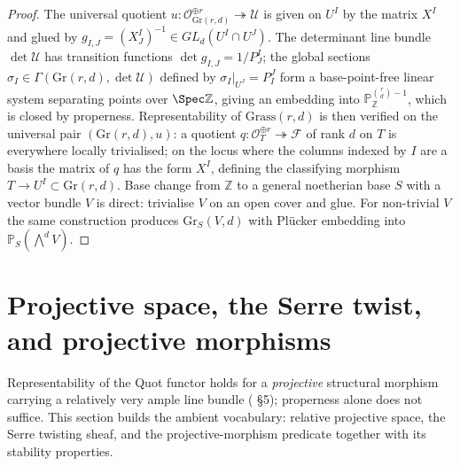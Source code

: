 \begin{proof}
  The universal quotient \(u : \mathcal{O}_{\mathrm{Gr}(r,d)}^{\oplus r}
  \twoheadrightarrow \mathcal{U}\) is given on \(U^I\) by the matrix \(X^I\)
  and glued by \(g_{I,J} = (X^I_J)^{-1} \in GL_d(U^I \cap U^J)\). The
  determinant line bundle \(\det\mathcal{U}\) has transition functions
  \(\det g_{I,J} = 1/P^I_J\); the global sections
  \(\sigma_I \in \Gamma(\mathrm{Gr}(r,d), \det\mathcal{U})\) defined by
  \(\sigma_I|_{U^J} = P^J_I\) form a base-point-free linear system separating
  points over \(\Spec\mathbb{Z}\), giving an embedding into
  \(\mathbb{P}^{\binom{r}{d}-1}_{\mathbb{Z}}\), which is closed by
  properness. Representability of \(\mathrm{Grass}(r,d)\) is then verified
  on the universal pair \((\mathrm{Gr}(r,d), u)\): a quotient
  \(q : \mathcal{O}_T^{\oplus r} \twoheadrightarrow \mathcal{F}\) of
  rank \(d\) on \(T\) is everywhere locally trivialised; on the locus where
  the columns indexed by \(I\) are a basis the matrix of \(q\) has the form
  \(X^I\), defining the classifying morphism \(T \to U^I \subset
  \mathrm{Gr}(r,d)\). Base change from \(\mathbb{Z}\) to a general noetherian
  base \(S\) with a vector bundle \(V\) is direct: trivialise \(V\) on an open
  cover and glue. For non-trivial \(V\) the same construction produces
  \(\mathrm{Gr}_S(V, d)\) with Pl\"ucker embedding into
  \(\mathbb{P}_S(\bigwedge^d V)\).
\end{proof}


\section{Projective space, the Serre twist, and projective morphisms}
\label{sec:projective_vocabulary}

Representability of the Quot functor holds for a \emph{projective} structural
morphism carrying a relatively very ample line bundle
(\cite{nitsure-hilbert-quot} \S 5); properness alone does not suffice.  This
section builds the ambient vocabulary: relative projective space, the Serre
twisting sheaf, and the projective-morphism predicate together with its
stability properties.


